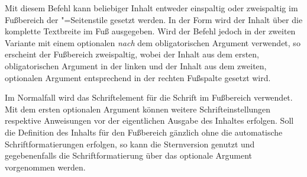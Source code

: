 \begin{Declaration*}{}
\begin{Declaration*}{}
\begin{Declaration*}{}
\begin{Declaration}[v2.04]{%
}
\begin{Declaration}[v2.04]{
}
\printdeclarationlist%
%
%
Mit diesem Befehl kann beliebiger Inhalt entweder einspaltig oder zweispaltig 
im Fußbereich der "=Seitenstile gesetzt werden. In der 
Form  wird der Inhalt über die komplette 
Textbreite im Fuß ausgegeben. Wird der Befehl jedoch in der zweiten Variante 
 mit 
einem optionalen \emph{nach} dem obligatorischen Argument verwendet, so 
erscheint der Fußbereich zweispaltig, wobei der Inhalt aus dem ersten, 
obligatorischen Argument in der linken und der Inhalt aus dem zweiten, 
optionalen Argument entsprechend in der rechten Fußspalte gesetzt wird.

Im Normalfall wird das Schriftelement  für die Schrift im 
Fußbereich verwendet. Mit dem ersten optionalen Argument können weitere 
Schrifteinstellungen respektive Anweisungen vor der eigentlichen Ausgabe des 
Inhaltes erfolgen. Soll die Definition des Inhalts für den Fußbereich gänzlich 
ohne die automatische Schriftformatierungen erfolgen, so kann die Sternversion 
 genutzt und gegebenenfalls die Schriftformatierung über 
das optionale Argument vorgenommen werden.
\end{Declaration}
\end{Declaration}


\end{Declaration*}
\end{Declaration*}
\end{Declaration*}
